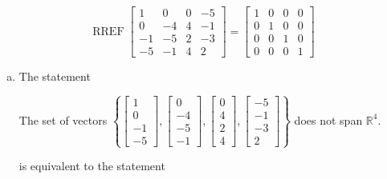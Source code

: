 \begin{exerciseAnswer} 


\[\operatorname{RREF} \left[\begin{array}{cccc}
1 & 0 & 0 & -5 \\
0 & -4 & 4 & -1 \\
-1 & -5 & 2 & -3 \\
-5 & -1 & 4 & 2
\end{array}\right] = \left[\begin{array}{cccc}
1 & 0 & 0 & 0 \\
0 & 1 & 0 & 0 \\
0 & 0 & 1 & 0 \\
0 & 0 & 0 & 1
\end{array}\right] \]


\begin{enumerate}[(a)]
\item The statement 
\begin{center}\begin{minipage}{0.8\textwidth}
 The set of vectors \( \left\{ \left[\begin{array}{c}
1 \\
0 \\
-1 \\
-5
\end{array}\right] , \left[\begin{array}{c}
0 \\
-4 \\
-5 \\
-1
\end{array}\right] , \left[\begin{array}{c}
0 \\
4 \\
2 \\
4
\end{array}\right] , \left[\begin{array}{c}
-5 \\
-1 \\
-3 \\
2
\end{array}\right] \right\} \) does not span \(\mathbb{R}^4\). 
\end{minipage}\end{center}
     is equivalent to the statement 
\begin{center}\begin{minipage}{0.8\textwidth}
 The vector equation \( x_{1} \left[\begin{array}{c}
1 \\
0 \\

\end{array}
\end{minipage}
\end{center}
\end{enumerate}
\end{exerciseAnswer}
